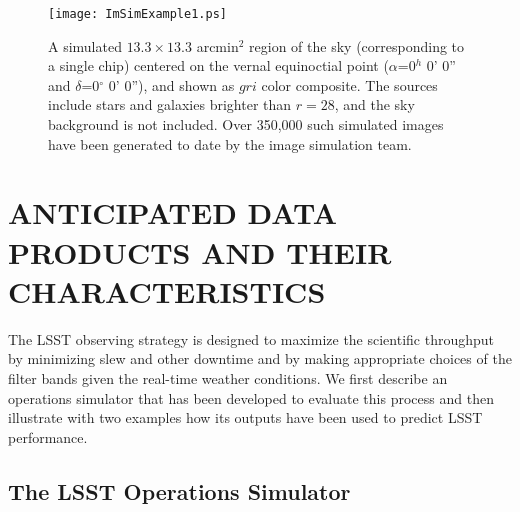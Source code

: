 \documentclass{emulateapj}
\begin{document}
\begin{figure}
\vskip -1in
\texttt{[image: ImSimExample1.ps]}
\vskip -1in
\caption{
A simulated $13.3\times13.3$ arcmin$^2$ region of the sky (corresponding to a single chip)
centered on the vernal equinoctial point ($\alpha$=0$^h$ 0' 0'' and $\delta$=0$^\circ$ 0' 0''),
and shown as $gri$ color composite. The sources include stars and galaxies brighter than $r=28$, and 
the sky background is not included. Over 350,000 such simulated images have been generated to date
by the image simulation team.} 
\label{Fig:ImSimExample}
\end{figure}



\section{    ANTICIPATED DATA PRODUCTS AND THEIR CHARACTERISTICS    }
\label{Sec:dataprod}

The LSST observing strategy is designed to maximize the scientific
throughput by minimizing slew and other downtime and by making appropriate
choices of the filter bands given the real-time weather conditions. We first
describe an operations simulator that has been developed to evaluate this process and then
illustrate with two examples how its outputs have been used to predict LSST
performance. 


\subsection{ The LSST Operations Simulator }
\end{document}
